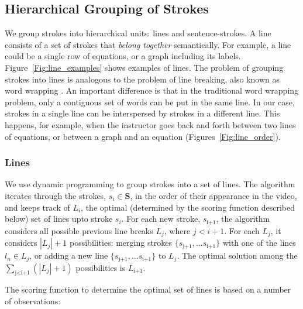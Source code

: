 \subsection{Hierarchical Grouping of Strokes}
We group strokes into hierarchical units: lines and sentence-strokes.  
A line consists of a set of strokes that \textit{belong together} semantically. For example, a line could be a single row of equations, or a graph including its labels. Figure~\ref{Fig:line_examples} shows examples of lines. The problem of grouping strokes into lines is analogous to the problem of line breaking, also known as word wrapping \cite{knuth1981breaking}. An important difference is that in the traditional word wrapping problem, only a contiguous set of words can be put in the same line. In our case, strokes in a single line can be interspersed by strokes in a different line. This happens, for example, when the instructor goes back and forth between two lines of equations, or between a graph and an equation (Figures~\ref{Fig:line_order}). 

\subsubsection{Lines}
We use dynamic programming to group strokes into a set of lines. The algorithm iterates through the strokes, $s_i \in \mathbf{S}$, in the order of their appearance in the video, and keeps track of $L_i$, the optimal (determined by the scoring function described below) set of lines upto stroke $s_i$. For each new stroke, $s_\text{i+1}$, the algorithm considers all possible previous line breaks $L_j$, where $j < i+1$. For each $L_j$, it considers $\left\vert{L_j}\right\vert + 1$ possibilities: merging strokes $\{s_\text{j+1}, ... s_\text{i+1}\}$ with one of the lines $l_n \in L_j$, or adding a new line $\{s_\text{j+1}, ... s_\text{i+1}\}$ to $L_j$. The optimal solution among the $\sum_\text{j$<$i+1}{(\left\vert{L_j}\right\vert+1)}$ possibilities is $L_\text{i+1}$.   

The scoring function to determine the optimal set of lines is based on a number of observations: 

